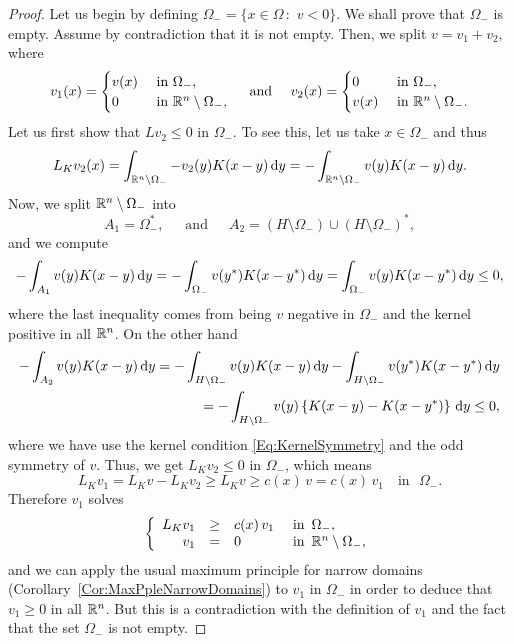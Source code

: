 \begin{proof}
	Let us begin by defining $\Omega_- = \{x\in \Omega \,:\,\, v<0\}$. We shall prove that $\Omega_-$ is empty. Assume by contradiction that it is not empty. Then, we split $ v = v_1+v_2$, where
	\begin{equation*}
	v_1(x) =
	\begin{cases}
	v(x)  &\textrm{ in } \Omega_-,\\
	0 &\textrm{ in } \mathbb{R}^n\setminus\Omega_-,
	\end{cases}
	\quad \text{ and } \quad
	v_2(x) =
	\begin{cases}
	0  &\textrm{ in } \Omega_-,\\
	v(x) &\textrm{ in } \mathbb{R}^n\setminus\Omega_-.
	\end{cases}
	\end{equation*}
	Let us first show that $Lv_2\leq 0$ in $\Omega_-$. To see this, let us take $x\in\Omega_-$ and thus
	$$
	L_K v_2(x) = \int_{\mathbb{R}^n\setminus\Omega_-} -v_2(y)K(x-y) \,\mathrm{d} y = -\int_{\mathbb{R}^n\setminus\Omega_-} v(y)K(x-y) \,\mathrm{d} y.
	$$
	Now, we split $\mathbb{R}^n\setminus\Omega_-$ into
	$$
	A_1 = \Omega_-^*,\,\,\,\,\,\,\,\text{ and }\,\,\,\,\,\,\, A_2 = \left(H\setminus\Omega_-\right)\cup\left(H\setminus\Omega_-\right)^*,
	$$
	and we compute
	\begin{align*}
	-\int_{A_1} v(y)K(x-y) \,\mathrm{d} y = -\int_{\Omega_-} v(y^*)K(x-y^*) \,\mathrm{d} y  = \int_{\Omega_-} v(y)K(x-y^*) \,\mathrm{d} y \leq 0,
	\end{align*}
	where the last inequality comes from being $v$ negative in $\Omega_-$ and the kernel positive in all $\mathbb{R}^n$.
	On the other hand
	\begin{align*}
	-\int_{A_2} v(y)K(x-y) \,\mathrm{d} y = -\int_{H\setminus\Omega_-} v(y)K(x-y) \,\mathrm{d} y  -\int_{H\setminus\Omega_-} v(y^*)K(x-y^*) \,\mathrm{d} y \\
	= -\int_{H\setminus\Omega_-} v(y)\left\{K(x-y)-K(x-y^*)\right\} \,\mathrm{d} y \leq 0,
	\end{align*}
	where we have use the kernel condition \eqref{Eq:KernelSymmetry} and the odd symmetry of $v$. Thus, we get $L_K v_2 \leq 0$ in $\Omega_-$, which means
	$$ L_K v_1 = L_K v-L_K v_2 \geq L_K v \geq c(x)\,v = c(x)\,v_1 \,\,\,\,\text{ in }\,\,\Omega_-. $$
	Therefore $v_1$ solves
	\begin{equation*}
	\left\{\begin{array}{rcll}
	L_K v_1 &\geq& c(x)\,v_1   &\textrm{ in } \,\Omega_-,\\
	v_1 &=& 0 &\textrm{ in }\,\mathbb{R}^n\setminus\Omega_-,
	\end{array} \right.
	\end{equation*}
	and we can apply the usual maximum principle for narrow domains (Corollary~\ref{Cor:MaxPpleNarrowDomains}) to $v_1$ in $\Omega_-$ in order to deduce that $v_1\geq 0$ in all $\mathbb{R}^n$. But this is a contradiction with the definition of $v_1$ and the fact that the set $\Omega_-$ is not empty.
\end{proof}



